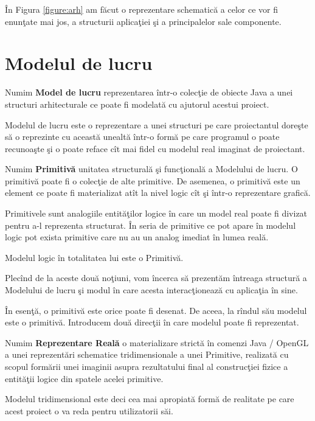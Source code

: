 În Figura \ref{figure:arh} am făcut o reprezentare schematică a celor ce vor fi
enunţate mai jos, a structurii aplicaţiei şi a principalelor sale componente.

\section{Modelul de lucru}

\begin{definition}
\label{define:model}
Numim \textbf{Model de lucru} reprezentarea într-o colecţie de obiecte Java a 
unei structuri arhitecturale ce poate fi modelată cu ajutorul acestui proiect.
\end{definition}

Modelul de lucru este o reprezentare a unei structuri pe care proiectantul 
doreşte să o reprezinte cu această unealtă într-o formă pe care programul o 
poate recunoaşte şi o poate reface cît mai fidel cu modelul real imaginat de 
proiectant.

\begin{definition}
\label{define:primitive}
Numim \textbf{Primitivă} unitatea structurală şi funcţională a Modelului de 
lucru. O primitivă poate fi o colecţie de alte primitive. De asemenea, o 
primitivă este un element ce poate fi materializat atît la nivel logic cît şi 
într-o reprezentare grafică.
\end{definition}

Primitivele sunt analogiile entităţilor logice în care un model real poate fi 
divizat pentru a-l reprezenta structurat. În seria de primitive ce pot apare în 
modelul logic pot exista primitive care nu au un analog imediat în lumea reală.

\begin{statement}
Modelul logic în totalitatea lui este o Primitivă.
\end{statement}

Plecînd de la aceste două noţiuni, vom încerca să prezentăm întreaga structură 
a Modelului de lucru şi modul în care acesta interacţionează cu aplicaţia în 
sine.

În esenţă, o primitivă este orice poate fi desenat. De aceea, la rîndul său 
modelul este o primitivă. Introducem două direcţii în care modelul poate fi 
reprezentat.

\begin{definition}
\label{define:realRender}
Numim \textbf{Reprezentare Reală} o materializare strictă în comenzi 
Java / OpenGL a unei reprezentări schematice tridimensionale a unei Primitive, 
realizată cu scopul formării unei imaginii asupra rezultatului final al 
construcţiei fizice a entităţii logice din spatele acelei primitive. 
\end{definition} Modelul tridimensional este deci cea mai apropiată formă de 
realitate pe care acest proiect o va reda pentru utilizatorii săi.

